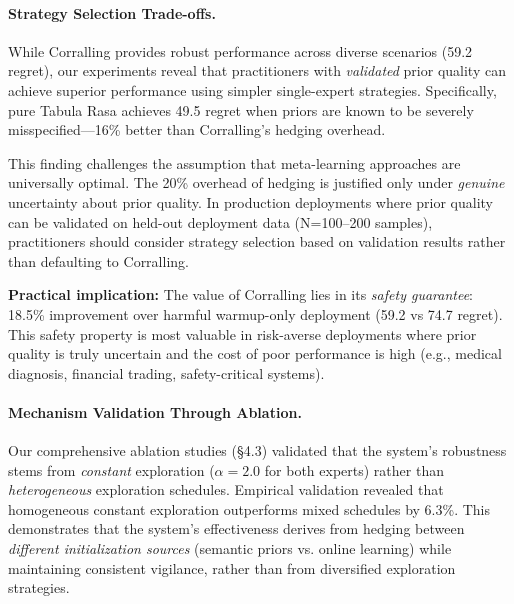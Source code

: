 \paragraph{Strategy Selection Trade-offs.}
While Corralling provides robust performance across diverse scenarios (59.2 regret), our experiments reveal that practitioners with \emph{validated} prior quality can achieve superior performance using simpler single-expert strategies.
Specifically, pure Tabula Rasa achieves 49.5 regret when priors are known to be severely misspecified---16\% better than Corralling's hedging overhead.

This finding challenges the assumption that meta-learning approaches are universally optimal.
The 20\% overhead of hedging is justified only under \emph{genuine} uncertainty about prior quality.
In production deployments where prior quality can be validated on held-out deployment data (N=100--200 samples), practitioners should consider strategy selection based on validation results rather than defaulting to Corralling.

\textbf{Practical implication:}
The value of Corralling lies in its \emph{safety guarantee}: 18.5\% improvement over harmful warmup-only deployment (59.2 vs 74.7 regret).
This safety property is most valuable in risk-averse deployments where prior quality is truly uncertain and the cost of poor performance is high (e.g., medical diagnosis, financial trading, safety-critical systems).

\paragraph{Mechanism Validation Through Ablation.}
Our comprehensive ablation studies (§4.3) validated that the system's robustness stems from \emph{constant} exploration ($\alpha=2.0$ for both experts) rather than \emph{heterogeneous} exploration schedules.
Empirical validation revealed that homogeneous constant exploration outperforms mixed schedules by 6.3\%.
This demonstrates that the system's effectiveness derives from hedging between \emph{different initialization sources} (semantic priors vs. online learning) while maintaining consistent vigilance, rather than from diversified exploration strategies.

